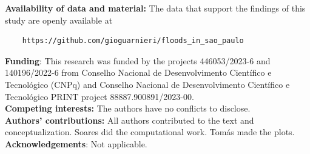 \documentclass[sn-nature]{sn-jnl}%
\theoremstyle{thmstyleone}%
\theoremstyle{thmstyletwo}%
\theoremstyle{thmstylethree}%
\begin{document}

\newpage
\thispagestyle{empty}

\noindent \textbf{Availability of data and material:} The data that support the findings of this study are openly available at 
\begin{verbatim}
    https://github.com/gioguarnieri/floods_in_sao_paulo
\end{verbatim}
\noindent \textbf{Funding}: This research was funded by the projects 446053/2023-6 and 140196/2022-6 from Conselho Nacional de Desenvolvimento Científico e Tecnológico (CNPq) and Conselho Nacional de Desenvolvimento Científico e Tecnológico PRINT project 88887.900891/2023-00.\\
\noindent \textbf{Competing interests:} The authors have no conflicts to disclose.\\
\noindent \textbf{Authors' contributions:} All authors contributed to the text and conceptualization. Soares did the computational work. Tomás made the plots.\\
\noindent \textbf{Acknowledgements}: Not applicable.





% 
\end{document}
